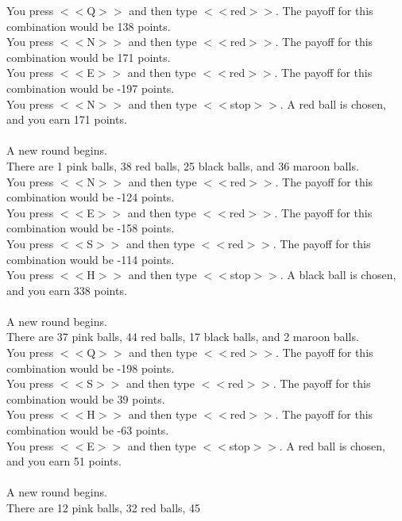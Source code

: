 \documentclass[pdflatex,sn-nature]{sn-jnl}%
\theoremstyle{thmstyleone}%
\theoremstyle{thmstyletwo}%
\theoremstyle{thmstylethree}%
\begin{document}
You press $<<$Q$>>$ and then type $<<$red$>>$. The payoff for this combination would be 138 points. $~$\\ 
You press $<<$N$>>$ and then type $<<$red$>>$. The payoff for this combination would be 171 points. $~$\\ 
You press $<<$E$>>$ and then type $<<$red$>>$. The payoff for this combination would be -197 points. $~$\\ 
You press $<<$N$>>$ and then type $<<$stop$>>$. A red ball is chosen, and you earn 171 points. $~$\\ 
 $~$\\ 
A new round begins. $~$\\ 
There are 1 pink balls, 38 red balls, 25 black balls, and 36 maroon balls. $~$\\ 
You press $<<$N$>>$ and then type $<<$red$>>$. The payoff for this combination would be -124 points. $~$\\ 
You press $<<$E$>>$ and then type $<<$red$>>$. The payoff for this combination would be -158 points. $~$\\ 
You press $<<$S$>>$ and then type $<<$red$>>$. The payoff for this combination would be -114 points. $~$\\ 
You press $<<$H$>>$ and then type $<<$stop$>>$. A black ball is chosen, and you earn 338 points. $~$\\ 
 $~$\\ 
A new round begins. $~$\\ 
There are 37 pink balls, 44 red balls, 17 black balls, and 2 maroon balls. $~$\\ 
You press $<<$Q$>>$ and then type $<<$red$>>$. The payoff for this combination would be -198 points. $~$\\ 
You press $<<$S$>>$ and then type $<<$red$>>$. The payoff for this combination would be 39 points. $~$\\ 
You press $<<$H$>>$ and then type $<<$red$>>$. The payoff for this combination would be -63 points. $~$\\ 
You press $<<$E$>>$ and then type $<<$stop$>>$. A red ball is chosen, and you earn 51 points. $~$\\ 
 $~$\\ 
A new round begins. $~$\\ 
There are 12 pink balls, 32 red balls, 45  
\end{document}

